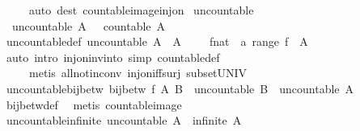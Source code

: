 \begin{isabellebody}
\ \ \ \ \ {\isacharparenleft}auto\ dest{\isacharcolon}\ countable{\isacharunderscore}image{\isacharunderscore}inj{\isacharunderscore}on{\isacharparenright}%
\endisatagproof
{\isafoldproof}%
%
\isadelimproof
%
\endisadelimproof
%
\isadelimdocument
%
\endisadelimdocument
%
\isatagdocument
%
\isamarkuptrue%
%
\endisatagdocument
{\isafolddocument}%
%
\isadelimdocument
%
\endisadelimdocument
{}\isamarkupfalse%
\ uncountable\ \isanewline
\ \ {\isachardoublequoteopen}uncountable\ A\ {\isasymequiv}\ {\isasymnot}\ countable\ A{\isachardoublequoteclose}\isanewline
\isanewline
{}\isamarkupfalse%
\ uncountable{\isacharunderscore}def{\isacharcolon}\ {\isachardoublequoteopen}uncountable\ A\ {\isasymlongleftrightarrow}\ A\ {\isasymnoteq}\ {\isacharbraceleft}{\isacharbraceright}\ {\isasymand}\ {\isasymnot}\ {\isacharparenleft}{\isasymexists}f{\isacharcolon}{\isacharcolon}{\isacharparenleft}nat\ {\isasymRightarrow}\ {\isacharprime}a{\isacharparenright}{\isachardot}\ range\ f\ {\isacharequal}\ A{\isacharparenright}{\isachardoublequoteclose}\isanewline
%
\isadelimproof
\ \ %
\endisadelimproof
%
\isatagproof
{}\isamarkupfalse%
\ {\isacharparenleft}auto\ intro{\isacharcolon}\ inj{\isacharunderscore}on{\isacharunderscore}inv{\isacharunderscore}into\ simp{\isacharcolon}\ countable{\isacharunderscore}def{\isacharparenright}\isanewline
\ \ \ \ \ {\isacharparenleft}metis\ all{\isacharunderscore}not{\isacharunderscore}in{\isacharunderscore}conv\ inj{\isacharunderscore}on{\isacharunderscore}iff{\isacharunderscore}surj\ subset{\isacharunderscore}UNIV{\isacharparenright}%
\endisatagproof
{\isafoldproof}%
%
\isadelimproof
\isanewline
%
\endisadelimproof
\isanewline
{}\isamarkupfalse%
\ uncountable{\isacharunderscore}bij{\isacharunderscore}betw{\isacharcolon}\ {\isachardoublequoteopen}bij{\isacharunderscore}betw\ f\ A\ B\ {\isasymLongrightarrow}\ uncountable\ B\ {\isasymLongrightarrow}\ uncountable\ A{\isachardoublequoteclose}\isanewline
%
\isadelimproof
\ \ %
\endisadelimproof
%
\isatagproof
{}\isamarkupfalse%
\ bij{\isacharunderscore}betw{\isacharunderscore}def\ \isamarkupfalse%
\ {\isacharparenleft}metis\ countable{\isacharunderscore}image{\isacharparenright}%
\endisatagproof
{\isafoldproof}%
%
\isadelimproof
\isanewline
%
\endisadelimproof
\isanewline
{}\isamarkupfalse%
\ uncountable{\isacharunderscore}infinite{\isacharcolon}\ {\isachardoublequoteopen}uncountable\ A\ {\isasymLongrightarrow}\ infinite\ A{\isachardoublequoteclose}\isanewline

\end{isabellebody}
